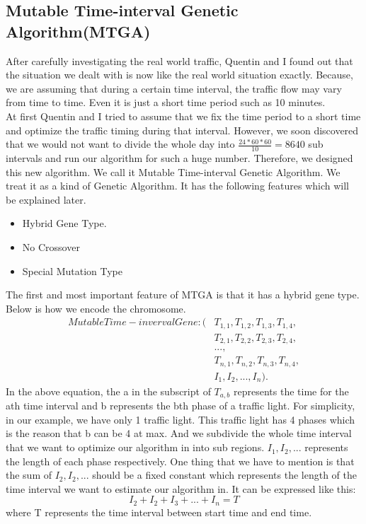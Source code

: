 \documentclass{article} %
\begin{document}
\subsection{Mutable Time-interval Genetic Algorithm(MTGA)}
After carefully investigating the real world traffic, Quentin and I found out that the situation we dealt with is now like the real world situation exactly. Because, we are assuming that during a certain time interval, the traffic flow may vary from time to time. Even it is just a short time period such as 10 minutes. \\
At first Quentin and I tried to assume that we fix the time period to a short time and optimize the traffic timing during that interval. However, we soon discovered that we would not want to divide the whole day into $\frac{24 * 60 * 60}{10} = 8640$ sub intervals and run our algorithm for such a huge number. Therefore, we designed this new algorithm. We call it Mutable Time-interval Genetic Algorithm. We treat it as a kind of Genetic Algorithm. It has the following features which will be explained later.
\begin{itemize}
	\item Hybrid Gene Type.
	\item No Crossover
	\item Special Mutation Type
\end{itemize}
The first and most important feature of MTGA is that it has a hybrid gene type. Below is how we encode the chromosome.
\begin{align}
Mutable Time-inverval Gene:
(&T_{1,1}, T_{1,2}, T_{1,3}, T_{1,4},\\
&T_{2,1}, T_{2,2}, T_{2,3}, T_{2,4},\\
&...,\\
&T_{n,1}, T_{n, 2}, T_{n,3}, T_{n, 4},\\
&I_1, I_2, ..., I_n).
\end{align}
In the above equation, the a in the subscript of $T_{a,b}$ represents the time for the ath time interval and b represents the bth phase of a traffic light. For simplicity, in our example, we have only 1 traffic light. This traffic light has 4 phases which is the reason that b can be 4 at max. And we subdivide the whole time interval that we want to optimize our algorithm in into  sub regions. $I_1, I_2, ...$ represents the length of each phase respectively. One thing that we have to mention is that the sum of $I_2, I_2, ...$ should be a fixed constant which represents the length of the time interval we want to estimate our algorithm in. It can be expressed like this:
\begin{equation}
\label{equ_sum_fixed}
I_2 + I_2 + I_3 + ... + I_n = T
\end{equation} 
where T represents the time interval between start time and end time.\\
\end{document}
